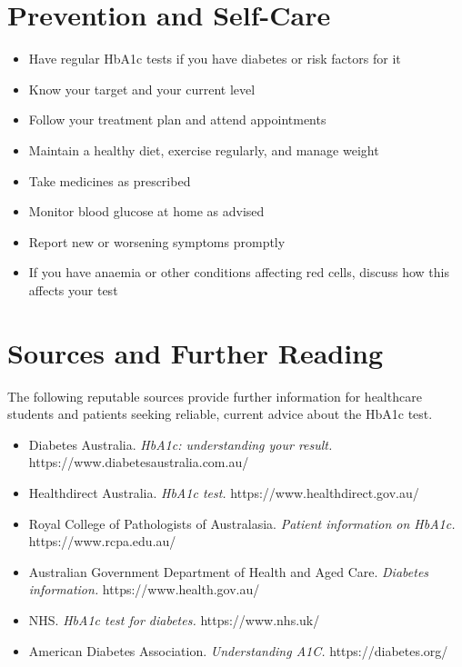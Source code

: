\section*{Prevention and Self-Care}
\begin{itemize}
    \item Have regular HbA1c tests if you have diabetes or risk factors for it
    \item Know your target and your current level
    \item Follow your treatment plan and attend appointments
    \item Maintain a healthy diet, exercise regularly, and manage weight
    \item Take medicines as prescribed
    \item Monitor blood glucose at home as advised
    \item Report new or worsening symptoms promptly
    \item If you have anaemia or other conditions affecting red cells, discuss how this affects your test
\end{itemize}

\section*{Sources and Further Reading}
The following reputable sources provide further information for healthcare students and patients seeking reliable, current advice about the HbA1c test.

\begin{itemize}
    \item Diabetes Australia. \textit{HbA1c: understanding your result.} https://www.diabetesaustralia.com.au/
    \item Healthdirect Australia. \textit{HbA1c test.} https://www.healthdirect.gov.au/
    \item Royal College of Pathologists of Australasia. \textit{Patient information on HbA1c.} https://www.rcpa.edu.au/
    \item Australian Government Department of Health and Aged Care. \textit{Diabetes information.} https://www.health.gov.au/
    \item NHS. \textit{HbA1c test for diabetes.} https://www.nhs.uk/
    \item American Diabetes Association. \textit{Understanding A1C.} https://diabetes.org/
\end{itemize}
